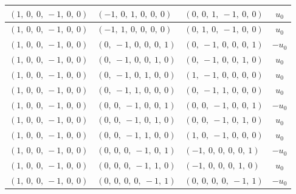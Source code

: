 \documentclass[11pt]{article}
\theoremstyle{definition}
\begin{document}
\begin{longtable}{|l|l|l|c|}
    \hline
    $\left( 1, \  0, \  0, \  -1, \  0, \  0\right)$ & $\left( -1, \  0, \  1, \  0, \  0, \  0\right)$ & $\left( 0, \  0, \  1, \  -1, \  0, \  0\right)$ & $u_{0}$ \\
    \hline
    $\left( 1, \  0, \  0, \  -1, \  0, \  0\right)$ & $\left( -1, \  1, \  0, \  0, \  0, \  0\right)$ & $\left( 0, \  1, \  0, \  -1, \  0, \  0\right)$ & $u_{0}$ \\
    \hline
    $\left( 1, \  0, \  0, \  -1, \  0, \  0\right)$ & $\left( 0, \  -1, \  0, \  0, \  0, \  1\right)$ & $\left( 0, \  -1, \  0, \  0, \  0, \  1\right)$ & $- u_{0}$ \\
    \hline
    $\left( 1, \  0, \  0, \  -1, \  0, \  0\right)$ & $\left( 0, \  -1, \  0, \  0, \  1, \  0\right)$ & $\left( 0, \  -1, \  0, \  0, \  1, \  0\right)$ & $u_{0}$ \\
    \hline
    $\left( 1, \  0, \  0, \  -1, \  0, \  0\right)$ & $\left( 0, \  -1, \  0, \  1, \  0, \  0\right)$ & $\left( 1, \  -1, \  0, \  0, \  0, \  0\right)$ & $u_{0}$ \\
    \hline
    $\left( 1, \  0, \  0, \  -1, \  0, \  0\right)$ & $\left( 0, \  -1, \  1, \  0, \  0, \  0\right)$ & $\left( 0, \  -1, \  1, \  0, \  0, \  0\right)$ & $u_{0}$ \\
    \hline
    $\left( 1, \  0, \  0, \  -1, \  0, \  0\right)$ & $\left( 0, \  0, \  -1, \  0, \  0, \  1\right)$ & $\left( 0, \  0, \  -1, \  0, \  0, \  1\right)$ & $- u_{0}$ \\
    \hline
    $\left( 1, \  0, \  0, \  -1, \  0, \  0\right)$ & $\left( 0, \  0, \  -1, \  0, \  1, \  0\right)$ & $\left( 0, \  0, \  -1, \  0, \  1, \  0\right)$ & $u_{0}$ \\
    \hline
    $\left( 1, \  0, \  0, \  -1, \  0, \  0\right)$ & $\left( 0, \  0, \  -1, \  1, \  0, \  0\right)$ & $\left( 1, \  0, \  -1, \  0, \  0, \  0\right)$ & $u_{0}$ \\
    \hline
    $\left( 1, \  0, \  0, \  -1, \  0, \  0\right)$ & $\left( 0, \  0, \  0, \  -1, \  0, \  1\right)$ & $\left( -1, \  0, \  0, \  0, \  0, \  1\right)$ & $- u_{0}$ \\
    \hline
    $\left( 1, \  0, \  0, \  -1, \  0, \  0\right)$ & $\left( 0, \  0, \  0, \  -1, \  1, \  0\right)$ & $\left( -1, \  0, \  0, \  0, \  1, \  0\right)$ & $u_{0}$ \\
    \hline
    $\left( 1, \  0, \  0, \  -1, \  0, \  0\right)$ & $\left( 0, \  0, \  0, \  0, \  -1, \  1\right)$ & $\left( 0, \  0, \  0, \  0, \  -1, \  1\right)$ & $- u_{0}$ \\

\end{longtable}
\end{document}

